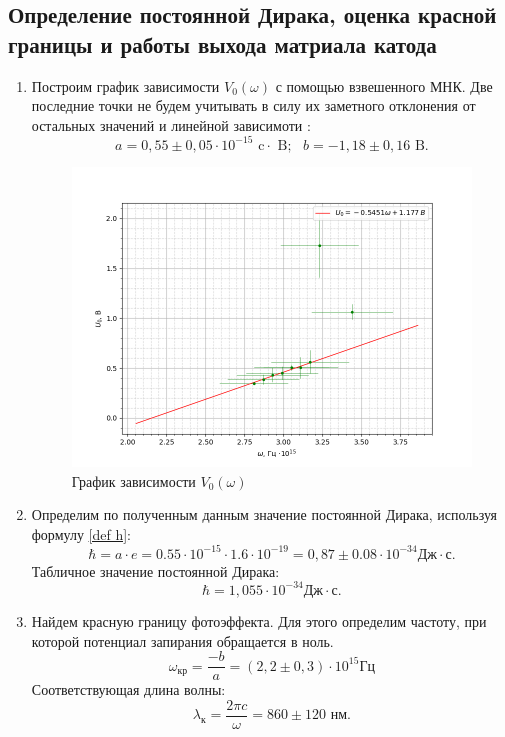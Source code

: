 \documentclass[a4paper,12pt]{article}
\begin{document}
\subsection{Определение постоянной Дирака, оценка красной границы и работы выхода матриала катода}

\begin{enumerate}


\item  Построим график зависимости $V_0(\omega)$ с помощью взвешенного МНК. Две последние точки не будем учитывать в силу их заметного отклонения от остальных значений и линейной зависимоти :
\begin{equation*}
    a = 0,55 \pm 0,05 \cdot 10^{-15}\text{ c}\cdot \text{ B};~~~b = -1,18 \pm 0,16 \text{ B}.
\end{equation*}

\begin{figure}[h!]
    \centering
    \includegraphics[scale = 0.9]{5.5.1(hhhh).png}
    \caption{График зависимости $V_0(\omega)$}
    \label{fig: h}
\end{figure}


\item Определим по полученным данным значение постоянной Дирака, используя формулу \eqref{def h}:
\begin{equation*}
    \hbar = a \cdot e = 0.55\cdot 10^{-15}\cdot 1.6\cdot 10^{-19} = 0,87 \pm 0.08 \cdot 10^{-34}\text{Дж}\cdot \text{с}.
\end{equation*}
Табличное значение постоянной Дирака: 
\begin{equation*}
    \hbar = 1,055\cdot 10^{-34} \text{Дж}\cdot \text{с}.
\end{equation*}
\item Найдем красную границу фотоэффекта. Для этого определим частоту, при которой потенциал запирания обращается в ноль.
\begin{equation*}
    \omega_{кр} = \frac{-b}{a} = (2,2 \pm 0,3 )\cdot 10^{15} \text{Гц}
\end{equation*}
Соответствующая длина волны:
\begin{equation}
    \lambda_\text{к} = \frac{2\pi c}{\omega} = 860 \pm 120\text{ нм}.
\end{equation}



\end{enumerate}
\end{document}
